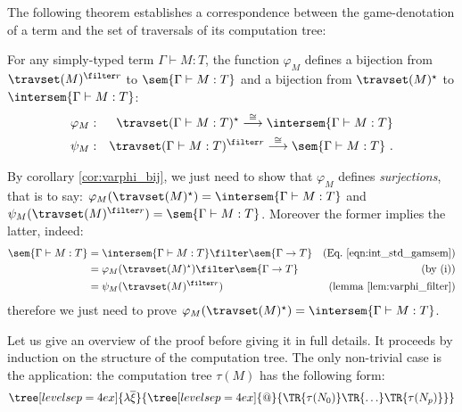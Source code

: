 The following theorem establishes a correspondence between the
game-denotation of a term and the set of traversals of its
computation tree:
\begin{theorem}
\label{thm:correspondence}
 For any simply-typed term $\Gamma \vdash M :T$,
the function $\varphi_M$ defines a bijection from $\travset(M)^{\filter
r}$ to $\sem{\Gamma \vdash M : T}$ and a bijection from
$\travset(M)^\star$ to $\intersem{\Gamma \vdash M : T}$:
\begin{eqnarray*}
 \varphi_M  &:& \travset(\Gamma \vdash M : T)^\star \stackrel{\cong}{\longrightarrow} \intersem{\Gamma \vdash M :T} \\
 \psi_M  &:& \travset(\Gamma \vdash M : T)^{\filter r} \stackrel{\cong}{\longrightarrow} \sem{\Gamma \vdash M :T} \ .
\end{eqnarray*}

\end{theorem}

\begin{remark}
\label{rem:corresp_proofreduction}
    By corollary \ref{cor:varphi_bij}, we just need to show that
    $\varphi_M$ defines \emph{surjections}, that is to
    say: $\varphi_M(\travset(M)^\star) = \intersem{\Gamma \vdash M : T}$
    and $\psi_M(\travset(M)^{\filter r}) = \sem{\Gamma \vdash M : T}$.
    Moreover the former implies the latter, indeed:
    \begin{align*}
    \sem{\Gamma \vdash M : T} &= \intersem{\Gamma \vdash M : T} \filter \sem{\Gamma \rightarrow T} & \mbox{(Eq.\ \ref{eqn:int_std_gamsem})} \\
            &= \varphi_M(\travset(M)^\star) \filter \sem{\Gamma \rightarrow T} & \mbox{(by (i))}\\
            &= \psi_M(\travset(M)^{\filter r}) & \mbox{(lemma \ref{lem:varphi_filter})}
    \end{align*}
    therefore we just need to prove $\varphi_M(\travset(M)^\star) = \intersem{\Gamma \vdash M : T}$.
\end{remark}
\smallskip

    Let us give an overview of the proof before giving it in full details.
    It proceeds by induction on the structure of the computation tree.
    The only non-trivial case is the application: the computation tree
    $\tau(M)$ has the following form:
        $$ \tree[levelsep=4ex]{\lambda \overline{\xi}}
            { \tree[levelsep=4ex]{@}
                {   \TR{\tau(N_0)} \TR{\ldots} \TR{\tau(N_p)}}}
        $$


